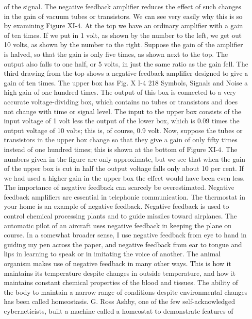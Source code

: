 {{{{{{{{{{{of the signal. The negative feedback amplifier reduces the effect
of such changes in the gain of vacuum tubes or transistors.
We can see very easily why this is so by examining Figure XI-4.
At the top we have an ordinary amplifier with a gain of ten times.
If we put in 1 volt, as shown by the number to the left, we get out
10 volts, as shown by the number to the right. Suppose the gain
of the amplifier is halved, so that the gain is only five times, as
shown next to the top. The output also falls to one half, or 5 volts,
in just the same ratio as the gain fell.
The third drawing from the top shows a negative feedback
amplifier designed to give a gain of ten times. The upper box has
Fig. X I-4
218
Symbols, Signals and Noise
a high gain of one hundred times. The output of this box is connected
to a very accurate voltage-dividing box, which contains no
tubes or transistors and does not change with time or signal level.
The input to the upper box consists of the input voltage of 1 volt
less the output of the lower box, which is 0.09 times the output
voltage of 10 volts; this is, of course, 0.9 volt.
Now, suppose the tubes or transistors in the upper box change
so that they give a gain of only fifty times instead of one hundred
times; this is shown at the bottom of Figure XI-4. The numbers
given in the figure are only approximate, but we see that when the
gain of the upper box is cut in half the output voltage falls only
about 10 per cent. If we had used a higher gain in the upper box
the effect would have been even less.
The importance of negative feedback can scarcely be overestimated.
Negative feedback amplifiers are essential in telephonic
communication. The thermostat in your home is an example of
negative feedback. Negative feedback is used to control chemical
processing plants and to guide missiles toward airplanes. The
automatic pilot of an aircraft uses negative feedback in keeping
the plane on course.
In a somewhat broader sense, I use negative feedback from eye
to hand in guiding my pen across the paper, and negative feedback
from ear to tongue and lips in learning to speak or in imitating
the voice of another. The animal organism makes use of negative
feedback in many other ways. This is how it maintains its temperature
despite changes in outside temperature, and how it maintains
constant chemical properties of the blood and tissues. The ability
of the body to maintain a narrow range of conditions despite
environmental changes has been called homeostasis.
G. Ross Ashby, one of the few self-acknowledged cyberneticists,
built a machine called a homeostat to demonstrate features of
}}}}}}}}}}}
